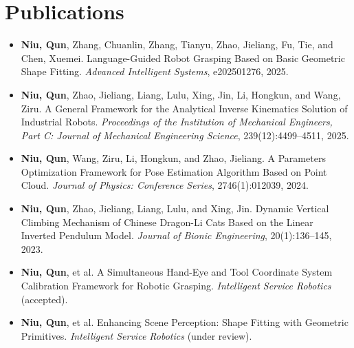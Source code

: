 \documentclass[11pt,a4paper]{article}
\begin{document}
\section*{Publications}
\begin{itemize}
	\item \textbf{Niu, Qun}, Zhang, Chuanlin, Zhang, Tianyu, Zhao, Jieliang, Fu, Tie, and Chen, Xuemei. Language-Guided Robot Grasping Based on Basic Geometric Shape Fitting. \textit{Advanced Intelligent Systems}, e202501276, 2025.
	\item \textbf{Niu, Qun}, Zhao, Jieliang, Liang, Lulu, Xing, Jin, Li, Hongkun, and Wang, Ziru. A General Framework for the Analytical Inverse Kinematics Solution of Industrial Robots. \textit{Proceedings of the Institution of Mechanical Engineers, Part C: Journal of Mechanical Engineering Science}, 239(12):4499--4511, 2025.
	\item \textbf{Niu, Qun}, Wang, Ziru, Li, Hongkun, and Zhao, Jieliang. A Parameters Optimization Framework for Pose Estimation Algorithm Based on Point Cloud. \textit{Journal of Physics: Conference Series}, 2746(1):012039, 2024.
	\item \textbf{Niu, Qun}, Zhao, Jieliang, Liang, Lulu, and Xing, Jin. Dynamic Vertical Climbing Mechanism of Chinese Dragon-Li Cats Based on the Linear Inverted Pendulum Model. \textit{Journal of Bionic Engineering}, 20(1):136--145, 2023.
	\item \textbf{Niu, Qun}, et al. A Simultaneous Hand-Eye and Tool Coordinate System Calibration Framework for Robotic Grasping. \textit{Intelligent Service Robotics} (accepted).
	\item \textbf{Niu, Qun}, et al. Enhancing Scene Perception: Shape Fitting with Geometric Primitives. \textit{Intelligent Service Robotics} (under review).
\end{itemize}
\end{document}
